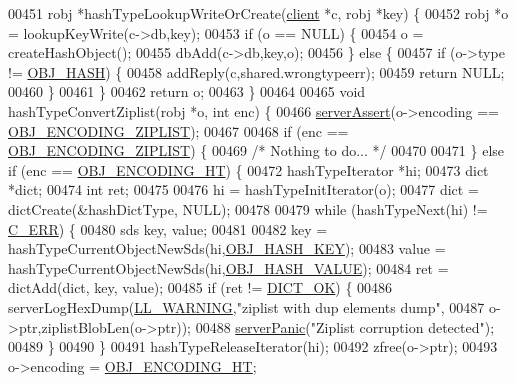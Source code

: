 \begin{DoxyCode}
00451 robj *hashTypeLookupWriteOrCreate(\hyperlink{structclient}{client} *c, robj *key) \{
00452     robj *o = lookupKeyWrite(c->db,key);
00453     \textcolor{keywordflow}{if} (o == NULL) \{
00454         o = createHashObject();
00455         dbAdd(c->db,key,o);
00456     \} \textcolor{keywordflow}{else} \{
00457         \textcolor{keywordflow}{if} (o->type != \hyperlink{server_8h_a87c05ba4f7f36741864277f02a4423fb}{OBJ\_HASH}) \{
00458             addReply(c,shared.wrongtypeerr);
00459             \textcolor{keywordflow}{return} NULL;
00460         \}
00461     \}
00462     \textcolor{keywordflow}{return} o;
00463 \}
00464 
00465 \textcolor{keywordtype}{void} hashTypeConvertZiplist(robj *o, \textcolor{keywordtype}{int} enc) \{
00466     \hyperlink{server_8h_a88114b5169b4c382df6b56506285e56a}{serverAssert}(o->encoding == \hyperlink{server_8h_aabf064ede983103f1fd0df2086e84eee}{OBJ\_ENCODING\_ZIPLIST});
00467 
00468     \textcolor{keywordflow}{if} (enc == \hyperlink{server_8h_aabf064ede983103f1fd0df2086e84eee}{OBJ\_ENCODING\_ZIPLIST}) \{
00469         \textcolor{comment}{/* Nothing to do... */}
00470 
00471     \} \textcolor{keywordflow}{else} \textcolor{keywordflow}{if} (enc == \hyperlink{server_8h_a9c10219f68afc557d510d108257d238b}{OBJ\_ENCODING\_HT}) \{
00472         hashTypeIterator *hi;
00473         dict *dict;
00474         \textcolor{keywordtype}{int} ret;
00475 
00476         hi = hashTypeInitIterator(o);
00477         dict = dictCreate(&hashDictType, NULL);
00478 
00479         \textcolor{keywordflow}{while} (hashTypeNext(hi) != \hyperlink{server_8h_af98ac28d5f4d23d7ed5985188e6fb7d1}{C\_ERR}) \{
00480             sds key, value;
00481 
00482             key = hashTypeCurrentObjectNewSds(hi,\hyperlink{server_8h_aede46b2a96d6f19aff38ccdac76598ac}{OBJ\_HASH\_KEY});
00483             value = hashTypeCurrentObjectNewSds(hi,\hyperlink{server_8h_a1f87a280688b29cd45aa3aa0dceac7c7}{OBJ\_HASH\_VALUE});
00484             ret = dictAdd(dict, key, value);
00485             \textcolor{keywordflow}{if} (ret != \hyperlink{dict_8h_a2afecbeab8f7efbc183048f52f6d17e5}{DICT\_OK}) \{
00486                 serverLogHexDump(\hyperlink{server_8h_a31229b9334bba7d6be2a72970967a14b}{LL\_WARNING},\textcolor{stringliteral}{"ziplist with dup elements dump"},
00487                     o->ptr,ziplistBlobLen(o->ptr));
00488                 \hyperlink{server_8h_a11cc378e7778a830b41240578de3b204}{serverPanic}(\textcolor{stringliteral}{"Ziplist corruption detected"});
00489             \}
00490         \}
00491         hashTypeReleaseIterator(hi);
00492         zfree(o->ptr);
00493         o->encoding = \hyperlink{server_8h_a9c10219f68afc557d510d108257d238b}{OBJ\_ENCODING\_HT};

\end{DoxyCode}

